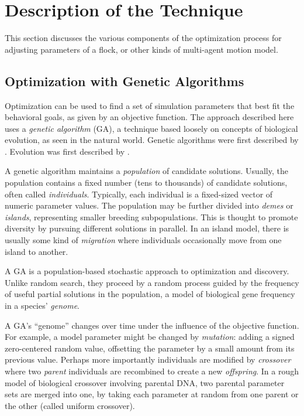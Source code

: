\documentclass[letterpaper]{article}
\begin{document}
\section{Description of the Technique}
\label{sec:Description}

This section discusses the various components of the optimization process for adjusting parameters of a flock, or other kinds of multi-agent motion model.

\subsection{Optimization with Genetic Algorithms}
\label{subsec:Optimization_with_GA}

Optimization can be used to find a set of simulation parameters that best fit the behavioral goals, as given by an objective function. The approach described here uses a \textit{genetic algorithm} (GA), a technique based loosely on concepts of biological evolution, as seen in the natural world. Genetic algorithms were first described by \citet{holland_adaptation_1975}. Evolution was first described by \citet{darwin_origin_1859}.

A genetic algorithm maintains a \textit{population} of candidate solutions. Usually, the population contains a fixed number (tens to thousands) of candidate solutions, often called \textit{individuals}. Typically, each individual is a fixed-sized vector of numeric parameter values. The population may be further divided into \textit{demes} or \textit{islands}, representing smaller breeding subpopulations. This is thought to promote diversity by pursuing different solutions in parallel. In an island model, there is usually some kind of \textit{migration} where individuals occasionally move from one island to another.

A GA is a population-based stochastic approach to optimization and discovery. Unlike random search, they proceed by a random process guided by the frequency of useful partial solutions in the population, a model of biological gene frequency in a species' \textit{genome}.

A GA's ``genome'' changes over time under the influence of the objective function. For example, a model parameter might be changed by \textit{mutation}: adding a signed zero-centered random value, offsetting the parameter by a small amount from its previous value. Perhaps more importantly individuals are modified by \textit{crossover} where two \textit{parent} individuals are recombined to create a new \textit{offspring}. In a rough model of biological crossover involving parental DNA, two parental parameter sets are merged into one, by taking each parameter at random from one parent or the other (called uniform crossover).
\end{document}
